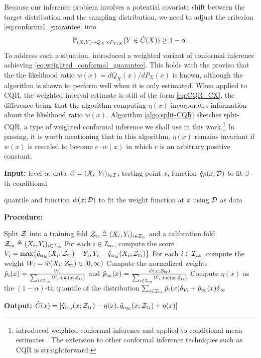 Because our inference problem involves a potential covariate shift
between the target distribution and the sampling distribution, we need
to adjust the criterion \eqref{eq:conformal_guarantee} into
\begin{equation}
  \label{eq:weighted_conformal_guarantee}
  \P_{(X, Y)\sim Q_{X}\times P_{Y\mid X}}(Y \in \hat{C}(X))\ge 1 - \alpha.
\end{equation}
To address such a situation, \cite{barber2019conformal} introduced a
weighted variant of conformal inference achieving
\eqref{eq:weighted_conformal_guarantee}. This holds with the proviso
that the the likelihood ratio $w(x) = dQ_{X}(x) / dP_{X}(x)$ is known,
although the algorithm is shown to perform well when it is only
estimated.  When applied to CQR, the weighted interval estimate is
still of the form \eqref{eq:CQR_CX}, the difference being that the
algorithm computing $\eta(x)$ incorporates information about the
likelihood ratio $w(x)$.  Algorithm \ref{algo:split-CQR} sketches
split-CQR, a type of weighted conformal inference we shall use in this
work.\footnote{\cite{barber2019conformal} introduced weighted
  conformal inference and applied to conditional mean estimates
  \citep[e.g.][]{lei2018distribution}. The extension to other conformal
  inference techniques such as CQR is straightforward.}  In passing,
it is worth mentioning that in this algorithm, $\eta(x)$ remains
invariant if $w(x)$ is rescaled to become $c \cdot w(x)$ in which $c$
is an arbitrary positive constant.


\begin{algorithm}[H]
  \caption{Weighted split-CQR}  \label{algo:split-CQR}
  \textbf{Input: } level $\alpha$, data $\Z = (X_{i}, Y_{i})_{i\in \I}$, testing point $x$, function $\hat{q}_{\beta}(x; \D)$ to fit $\beta$-th conditional 

  \hspace{1.4cm} quantile and function $\hat{w}(x; \D)$ to fit the weight function at $x$ using $\D$ as data

  \textbf{Procedure: }
  \begin{algorithmic}[1]
    \State Split $\Z$ into a training fold $\Z_{\tr} \triangleq (X_{i}, Y_{i})_{i\in \I_{\tr}}$ and a calibration fold $\Z_{\ca}\triangleq (X_{i}, Y_{i})_{i\in \I_{\ca}}$
    \State For each $i \in \I_{\ca}$, compute the score $V_{i} = \max\{\hat{q}_{\alpha_{\lo}}(X_{i}; \Z_{\tr}) - Y_{i}, Y_{i} - \hat{q}_{\alpha_{\hi}}(X_{i}; \Z_{\tr})\}$
    \State For each $i \in \I_{\ca}$, compute the weight $W_{i} = \hat{w}(X_{i}; \Z_{\tr}) \in [0, \infty)$
    \State Compute the normalized weights $\hat{p}_{i}(x) = \frac{W_{i}}{\sum_{i\in \I_{\ca}}W_{i} + \hat{w}(x; \Z_{\tr})}$ and $\hat{p}_{\infty}(x) = \frac{\hat{w}(x; \Z_{\tr})}{\sum_{i\in \I_{\ca}}W_{i} + \hat{w}(x; \Z_{\tr})}$
    \State Compute $\eta(x)$ as the $(1 - \alpha)$-th quantile of the distribution $\sum_{i\in \I_{\ca}}\hat{p}_{i}(x)\delta_{V_{i}} + \hat{p}_{\infty}(x)\delta_{\infty}$
  \end{algorithmic}

  \textbf{Output: $\hat{C}(x) = [\hat{q}_{\alpha_{\lo}}(x; \Z_{\tr}) - \eta(x), \hat{q}_{\alpha_{\hi}}(x; \Z_{\tr}) + \eta(x)]$}  
\end{algorithm}

